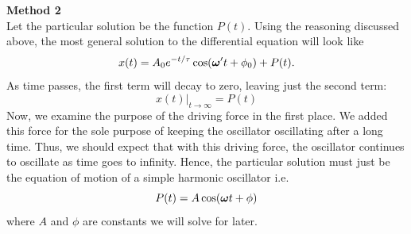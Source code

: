 \noindent \textbf{Method 2} \\
\noindent Let the particular solution be the function $P(t)$. Using the reasoning discussed above, the most general solution to the differential equation will look like
\begin{equation*}
    x(t) = A_0e^{-t/\tau}\cos(\boldsymbol{\omega}' t + \phi_0) + P(t).
\end{equation*}
\noindent As time passes, the first term will decay to zero, leaving just the second term:
\begin{equation*}
    x(t)|_{t\rightarrow\infty} = P(t)
\end{equation*}
\noindent Now, we examine the purpose of the driving force in the first place. We added this force for the sole purpose of keeping the oscillator oscillating after a long time. Thus, we should expect that with this driving force, the oscillator continues to oscillate as time goes to infinity. Hence, the particular solution must just be the equation of motion of a simple harmonic oscillator i.e.
\begin{equation*}
    P(t) = A\cos(\boldsymbol{\omega} t + \phi)
\end{equation*}
\noindent where $A$ and $\phi$ are constants we will solve for later.

